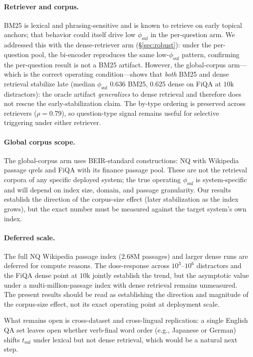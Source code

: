 \documentclass[11pt]{article}
\newcommand{\rhoDenseType}{0.79}     %
\newcommand{\phiSufGfiqaBm}{0.636}   %
\newcommand{\phiSufGfiqaDe}{0.625}   %
\begin{document}
\paragraph{Retriever and corpus.} BM25 is lexical and phrasing-sensitive and is
known to retrieve on early topical anchors; that behavior could itself drive low
$\phi_{\mathrm{suf}}$ in the per-question arm.  We addressed this with the
dense-retriever arm (\S\ref{sec:robust}): under the per-question pool, the
bi-encoder reproduces the same low-$\phi_{\mathrm{suf}}$ pattern, confirming
the per-question result is not a BM25 artifact.  However, the global-corpus
arm---which is the correct operating condition---shows that \emph{both} BM25
and dense retrieval stabilize late (median $\phi_{\mathrm{suf}}$
\phiSufGfiqaBm{} BM25, \phiSufGfiqaDe{} dense on FiQA at $10\mathrm{k}$
distractors): the oracle artifact \emph{generalizes} to dense retrieval and
therefore does not rescue the early-stabilization claim.  The by-type ordering
is preserved across retrievers ($\rho{=}\rhoDenseType{}$), so question-type
signal remains useful for selective triggering under either retriever.

\paragraph{Global corpus scope.} The global-corpus arm uses BEIR-standard
constructions: NQ with Wikipedia passage qrels and FiQA with its finance
passage pool.  These are not the retrieval corpora of any specific deployed
system; the true operating $\phi_{\mathrm{suf}}$ is system-specific and will
depend on index size, domain, and passage granularity.  Our results establish
the direction of the corpus-size effect (later stabilization as the index
grows), but the exact number must be measured against the target system's own
index.

\paragraph{Deferred scale.} The full NQ Wikipedia passage index ($2.68$M
passages) and larger dense runs are deferred for compute reasons.  The
dose-response across $10^3$--$10^6$ distractors and the FiQA dense point at
$10\mathrm{k}$ jointly establish the trend, but the asymptotic value under a
multi-million-passage index with dense retrieval remains unmeasured.  The
present results should be read as establishing the direction and magnitude of
the corpus-size effect, not its exact operating point at deployment scale.

What remains open is cross-dataset and cross-lingual replication: a single
English QA set leaves open whether verb-final word order (e.g., Japanese or
German) shifts $t_{\mathrm{suf}}$ under lexical but not dense retrieval,
which would be a natural next step.


\end{document}
